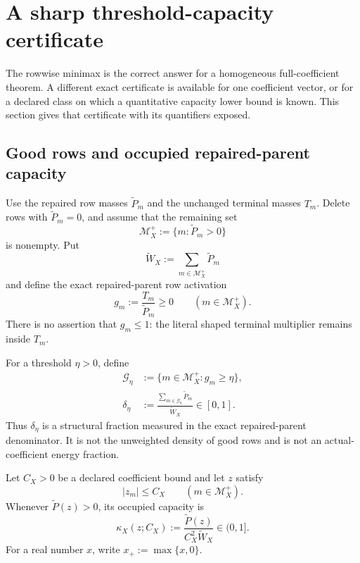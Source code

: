 \section{A sharp threshold-capacity certificate}
\label{sec:tpc64-capacity-certificate}

The rowwise minimax is the correct answer for a homogeneous
full-coefficient theorem.  A different exact certificate is available for
one coefficient vector, or for a declared class on which a quantitative
capacity lower bound is known.  This section gives that certificate with
its quantifiers exposed.

\subsection{Good rows and occupied repaired-parent capacity}

Use the repaired row masses \(\widetilde P_m\) and the unchanged terminal
masses \(T_m\).  Delete rows with
\(\widetilde P_m=0\), and assume that the remaining set
\begin{equation}
 \mathcal M_X^+
 :=\{m:\widetilde P_m>0\}
 \label{eq:tpc64-capacity-active-rows}
\end{equation}
is nonempty.  Put
\begin{equation}
 \widetilde W_X:=\sum_{m\in\mathcal M_X^+}\widetilde P_m
 \label{eq:tpc64-total-parent-capacity}
\end{equation}
and define the exact repaired-parent row activation
\begin{equation}
 g_m:=\frac{T_m}{\widetilde P_m}\ge0
 \qquad(m\in\mathcal M_X^+).
 \label{eq:tpc64-row-gain}
\end{equation}
There is no assertion that \(g_m\le1\): the literal shaped terminal
multiplier remains inside \(T_m\).

For a threshold \(\eta>0\), define
\begin{align}
 \mathcal G_\eta
 &:=\{m\in\mathcal M_X^+:g_m\ge\eta\},
 \label{eq:tpc64-threshold-good-rows}\\
 \delta_\eta
 &:=\frac{\sum_{m\in\mathcal G_\eta}\widetilde P_m}
              {\widetilde W_X}
 \in[0,1].
 \label{eq:tpc64-threshold-capacity-fraction}
\end{align}
Thus \(\delta_\eta\) is a structural fraction measured in the exact
repaired-parent denominator.  It is not the unweighted density of good
rows and is not an actual-coefficient energy fraction.

Let \(C_X>0\) be a declared coefficient bound and let \(z\) satisfy
\begin{equation}
 |z_m|\le C_X\qquad(m\in\mathcal M_X^+).
 \label{eq:tpc64-coefficient-cap}
\end{equation}
Whenever \(\widetilde P(z)>0\), its occupied capacity is
\begin{equation}
 \kappa_X(z;C_X)
 :=\frac{\widetilde P(z)}
 {C_X^2\widetilde W_X}
 \in(0,1].
 \label{eq:tpc64-occupied-parent-capacity}
\end{equation}
For a real number \(x\), write \(x_+:=\max\{x,0\}\).

